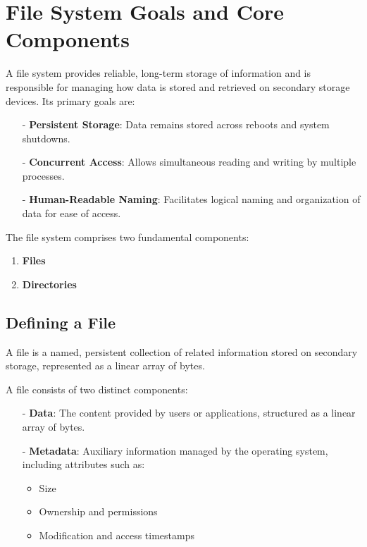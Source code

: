 \section{File System Goals and Core Components}
A file system provides reliable, long-term storage of information and is responsible for managing how data is stored and retrieved on secondary storage devices. Its primary goals are:

\begin{itemize}
    \item[-] \textbf{Persistent Storage}: Data remains stored across reboots and system shutdowns.
    \item[-] \textbf{Concurrent Access}: Allows simultaneous reading and writing by multiple processes.
    \item[-] \textbf{Human-Readable Naming}: Facilitates logical naming and organization of data for ease of access.
\end{itemize}

The file system comprises two fundamental components:
\begin{enumerate}
    \item \textbf{Files}
    \item \textbf{Directories}
\end{enumerate}

\subsection{Defining a File}

\begin{definition}[File]
A file is a named, persistent collection of related information stored on secondary storage, represented as a linear array of bytes.
\end{definition}

A file consists of two distinct components:

\begin{itemize}
  \item[-] \textbf{Data}: The content provided by users or applications, structured as a linear array of bytes.
  \item[-] \textbf{Metadata}: Auxiliary information managed by the operating system, including attributes such as:
    \begin{itemize}
        \item Size
        \item Ownership and permissions
        \item Modification and access timestamps
    \end{itemize}
\end{itemize}

